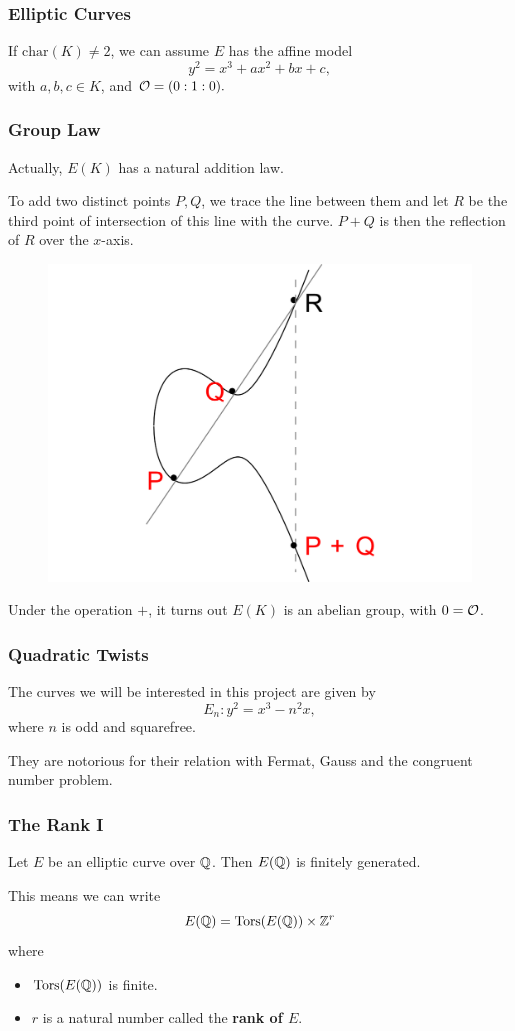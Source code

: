 \documentclass{beamer}
\begin{document}
\begin{frame}
\frametitle{Elliptic Curves}
  If $\text{char}(K) \neq 2$, we can assume $E$ has the affine model
  \[y^2 = x^3 + ax^2 + bx + c,\]
  with $a, b, c \in K$, and ${\mathcal O} = (0:1:0).$
\end{frame}

\begin{frame}
  \frametitle{Group Law}
  Actually, $E(K)$ has a natural addition law.
  \bigskip

  To add two distinct points $P, Q$, we trace the line
  between them and let $R$ be the third point of intersection of this line with
  the curve. $P+Q$ is then the reflection of $R$ over the $x$-axis. \pause
  \begin{figure}
    \centering
  \includegraphics{picture3}
  \end{figure} \pause

  Under the operation $+$, it turns out $E(K)$ is an abelian group, with $0 = {\mathcal O}$.
\end{frame}

\begin{frame}
  \frametitle{Quadratic Twists}
  The curves we will be interested in this project are given by
  \[E_n : y^2 = x^3 - n^2 x,\]
  where $n$ is odd and squarefree. \pause

  They are notorious for their relation with Fermat, Gauss and the
  congruent number problem.
\end{frame}

\begin{frame}
  \frametitle{The Rank I}
  \begin{theorem}
    Let $E$ be an elliptic curve over ${\mathbb Q}$. Then $E({\mathbb Q})$ is finitely generated.
  \end{theorem} \pause

  This means we can write
  \[E({\mathbb Q}) = {\text{\normalfont Tors}}(E({\mathbb Q})) \times {\mathbb Z}^r\]
  where
  \begin{itemize}
  \item ${\text{\normalfont Tors}}(E({\mathbb Q}))$ is finite.
  \item $r$ is a natural number called the \textbf{rank of $E$}.
  \end{itemize}
\end{frame}
\end{document}
